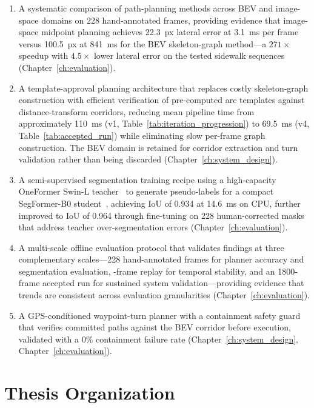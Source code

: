 \documentclass[12pt,letterpaper,oneside]{report}
\begin{document}
\begin{enumerate}[leftmargin=*]
  \item A systematic comparison of path-planning methods across BEV and image-space domains on 228 hand-annotated frames, providing evidence that image-space midpoint planning achieves 22.3~px lateral error at 3.1~ms per frame versus 100.5~px at 841~ms for the BEV skeleton-graph method---a $271\times$ speedup with $4.5\times$ lower lateral error on the tested sidewalk sequences (Chapter~\ref{ch:evaluation}).

  \item A template-approval planning architecture that replaces costly skeleton-graph construction with efficient verification of pre-computed arc templates against distance-transform corridors, reducing mean pipeline time from approximately 110~ms (v1, Table~\ref{tab:iteration_progression}) to 69.5~ms (v4, Table~\ref{tab:accepted_run}) while eliminating slow per-frame graph construction. The BEV domain is retained for corridor extraction and turn validation rather than being discarded (Chapter~\ref{ch:system_design}).

  \item A semi-supervised segmentation training recipe using a high-capacity OneFormer Swin-L teacher~\cite{oneformer} to generate pseudo-labels for a compact SegFormer-B0 student~\cite{segformer}, achieving IoU of 0.934 at 14.6~ms on CPU, further improved to IoU of 0.964 through fine-tuning on 228 human-corrected masks that address teacher over-segmentation errors (Chapter~\ref{ch:evaluation}).

  \item A multi-scale offline evaluation protocol that validates findings at three complementary scales---228 hand-annotated frames for planner accuracy and segmentation evaluation, -frame replay for temporal stability, and an 1800-frame accepted run for sustained system validation---providing evidence that trends are consistent across evaluation granularities (Chapter~\ref{ch:evaluation}).

  \item A GPS-conditioned waypoint-turn planner with a containment safety guard that verifies committed paths against the BEV corridor before execution, validated with a 0\% containment failure rate (Chapter~\ref{ch:system_design}, Chapter~\ref{ch:evaluation}).
\end{enumerate}


\section{Thesis Organization}
\end{document}
